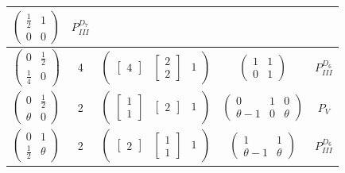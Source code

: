 \documentclass[12]{amsart}
\begin{document}
\begin{table}[h]
\begin{center}
\begin{tabular}{|c|c|c|c|c|}
$\begin{pmatrix} \frac{1}{2}&1\\ 0&0\end{pmatrix}$ & $P_{III}^{D_7}$\\
\hline
$\begin{pmatrix}0& \frac{1}{2}\\ \frac{1}{4} & 0\end{pmatrix}$ & 4 &
$\begin{pmatrix}   \left[\begin{matrix}4\end{matrix}\right] & \left[\begin{matrix}2\\2\end{matrix}\right] &  1\end{pmatrix}$ &
$\begin{pmatrix}1&1\\  0&1\end{pmatrix}$&$P_{III}^{D_6}$\\
\hline
$\begin{pmatrix}0& \frac{1}{2}\\ \theta & 0\end{pmatrix}$ & 2 &
$\begin{pmatrix}   \left[\begin{matrix}1\\1\end{matrix}\right] & \left[\begin{matrix}2\end{matrix}\right] &  1\end{pmatrix}$ &
$\begin{pmatrix}0&1&0 \\ \theta-1&0 & \theta \end{pmatrix}$& $P_{V}$\\
\hline
$\begin{pmatrix}0& 1\\ \frac{1}{2} & \theta\end{pmatrix}$ & 2 &
$\begin{pmatrix}    \left[\begin{matrix}2\end{matrix}\right] &  \left[\begin{matrix}1\\1\end{matrix}\right] & 1\end{pmatrix}$ &
$\begin{pmatrix}1& 1\\ \theta-1 & \theta\end{pmatrix}$& $P_{III}^{D_6}$\\

\end{tabular}
\end{center}
\end{table}
\end{document}
